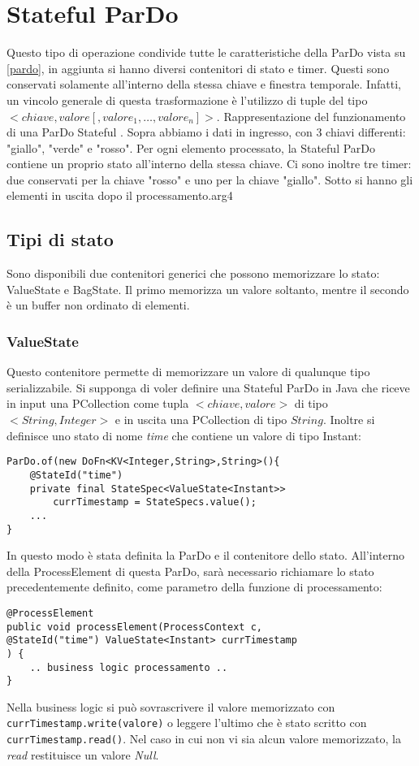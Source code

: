 \section{Stateful ParDo}\label{statefulpardo}
Questo tipo di operazione condivide tutte le caratteristiche della ParDo vista su \ref{pardo}, in aggiunta si hanno diversi contenitori di stato e timer. Questi sono conservati solamente all'interno della stessa chiave e finestra temporale. Infatti, un vincolo generale di questa trasformazione è l'utilizzo di tuple del tipo $ <chiave, valore [, valore_{1}, …, valore_{n}] > $.
{Rappresentazione del funzionamento di una ParDo Stateful \cite{knowles_2017_timely}. Sopra abbiamo i dati in ingresso, con 3 chiavi differenti: "giallo", "verde" e "rosso". Per ogni elemento processato, la Stateful ParDo contiene un proprio stato all'interno della stessa chiave. Ci sono inoltre tre timer: due conservati per la chiave "rosso" e uno per la chiave "giallo". Sotto si hanno gli elementi in uscita dopo il processamento.}{arg4}
\subsection{Tipi di stato}
Sono disponibili due contenitori generici che possono memorizzare lo stato: ValueState e BagState. Il primo memorizza un valore soltanto, mentre il secondo è un buffer non ordinato di elementi.
\subsubsection{ValueState}
Questo contenitore permette di memorizzare un valore di qualunque tipo serializzabile. Si supponga di voler definire una Stateful ParDo in Java che riceve in input una PCollection come tupla $ <chiave,valore> $ di tipo $ <String,Integer> $ e in uscita una PCollection di tipo $ String $. Inoltre si definisce uno stato di nome \textit{time} che contiene un valore di tipo Instant:
\begin{lstlisting}
ParDo.of(new DoFn<KV<Integer,String>,String>(){
	@StateId("time")
	private final StateSpec<ValueState<Instant>> 
		currTimestamp = StateSpecs.value();
	...
}	
\end{lstlisting}
In questo modo è stata definita la ParDo e il contenitore dello stato. All'interno della ProcessElement di questa ParDo, sarà necessario richiamare lo stato precedentemente definito, come parametro della funzione di processamento:
\begin{lstlisting}
@ProcessElement
public void processElement(ProcessContext c,
@StateId("time") ValueState<Instant> currTimestamp
) {
	.. business logic processamento ..
}
\end{lstlisting}
Nella business logic si può sovrascrivere il valore memorizzato con  \texttt{currTimestamp.write(valore)} o leggere l'ultimo che è stato scritto con \texttt{currTimestamp.read()}. Nel caso in cui non vi sia alcun valore memorizzato, la \textit{read} restituisce un valore \textit{Null}.
